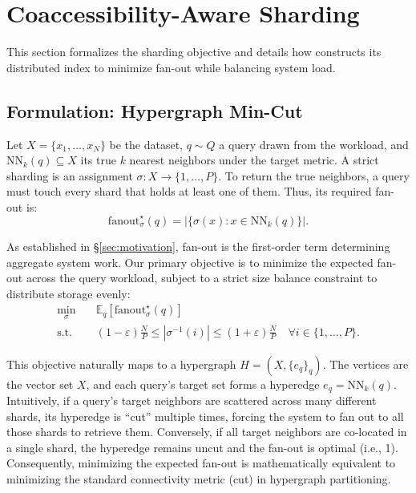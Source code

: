 \section{Coaccessibility-Aware Sharding}
\label{sec:offline_sharding}

This section formalizes the sharding objective and details how \sysname constructs its distributed index to minimize fan-out while balancing system load.

\subsection{Formulation: Hypergraph Min-Cut}
Let $X=\{x_1,\dots,x_N\}$ be the dataset, $q\sim Q$ a query drawn from the workload, and $\mathrm{NN}_k(q)\subseteq X$ its true $k$ nearest neighbors under the target metric. A strict sharding is an assignment $\sigma:X\to\{1,\dots,P\}$. To return the true neighbors, a query must touch every shard that holds at least one of them. Thus, its required fan-out is:
\[
\mathrm{fanout}^\star_\sigma(q)=\bigl|\{\sigma(x):x\in\mathrm{NN}_k(q)\}\bigr|.
\]

As established in \S\ref{sec:motivation}, fan-out is the first-order term determining aggregate system work. Our primary objective is to minimize the expected fan-out across the query workload, subject to a strict size balance constraint to distribute storage evenly:
\begin{equation}
\label{eq:objective}
\begin{aligned}
\min_{\sigma}\quad & \mathbb{E}_{q}\!\left[\mathrm{fanout}^\star_\sigma(q)\right] \\
\text{s.t.}\quad & (1-\varepsilon)\tfrac{N}{P}\le |\sigma^{-1}(i)| \le (1+\varepsilon)\tfrac{N}{P}\quad \forall i \in \{1,\dots,P\}.
\end{aligned}
\end{equation}

This objective naturally maps to a hypergraph $H=(X,\{e_q\}_q)$. The vertices are the vector set $X$, and each query's target set forms a hyperedge $e_q=\mathrm{NN}_k(q)$. Intuitively, if a query's target neighbors are scattered across many different shards, its hyperedge is ``cut'' multiple times, forcing the system to fan out to all those shards to retrieve them. Conversely, if all target neighbors are co-located in a single shard, the hyperedge remains uncut and the fan-out is optimal (i.e., 1). Consequently, minimizing the expected fan-out is mathematically equivalent to minimizing the standard connectivity metric (cut) in hypergraph partitioning.

